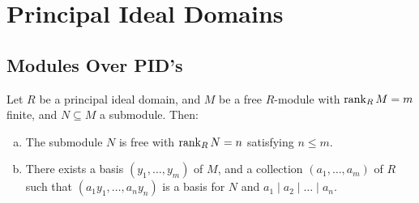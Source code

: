 \section{Principal Ideal Domains}

\subsection{Modules Over PID's}

\begin{theorem}
    \label{thm:module-over-PID}
    Let \(R\) be a principal ideal domain, and \(M\) be a free \(R\)-module with
    \(\operatorname{rank}_R M = m\) finite, and \(N \subseteq M\) a submodule. Then:
    \begin{enumerate}[(a)]\setlength\itemsep{0em}
        \item The submodule \(N\) is free with \(\operatorname{rank}_R N = n\) satisfying \(n \leq m\).
        \item There exists a basis \((y_1, \dots, y_m)\) of \(M\), and a collection
              \((a_1, \dots, a_m)\) of \(R\) such that \((a_1 y_1, \dots, a_n y_n)\) is a
              basis for \(N\) and \(a_1 \mid a_2 \mid \dots \mid a_n\).
    \end{enumerate}
\end{theorem}


